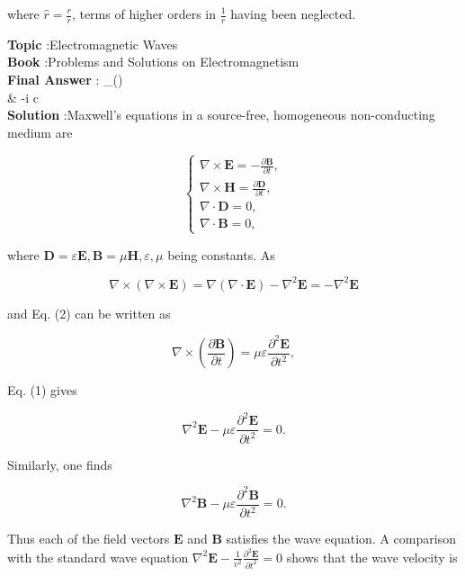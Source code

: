 \documentclass[10pt]{article}
\begin{document}
where $\hat{r}=\frac{r}{r}$, terms of higher orders in $\frac{1}{r}$ having been neglected.



\textbf{Topic} :Electromagnetic Waves\\
\textbf{Book} :Problems and Solutions on Electromagnetism\\
\textbf{Final Answer} : \nabla \times {}_{\omega}() \\
& \approx-i c   \times{}\\


\textbf{Solution} :Maxwell's equations in a source-free, homogeneous non-conducting medium are

$$
\left\{\begin{array}{l}
\nabla \times \mathbf{E}=-\frac{\partial \mathbf{B}}{\partial t}, \\
\nabla \times \mathbf{H}=\frac{\partial \mathbf{D}}{\partial t}, \\
\nabla \cdot \mathbf{D}=0, \\
\nabla \cdot \mathbf{B}=0,
\end{array}\right.
$$

where $\mathbf{D}=\varepsilon \mathbf{E}, \mathbf{B}=\mu \mathbf{H}, \varepsilon, \mu$ being constants. As

$$
\nabla \times(\nabla \times \mathbf{E})=\nabla(\nabla \cdot \mathbf{E})-\nabla^{2} \mathbf{E}=-\nabla^{2} \mathbf{E}
$$

and Eq.
(2) can be written as

$$
\nabla \times\left(\frac{\partial \mathbf{B}}{\partial t}\right)=\mu \varepsilon \frac{\partial^{2} \mathbf{E}}{\partial t^{2}},
$$

Eq.
(1) gives

$$
\nabla^{2} \mathbf{E}-\mu \varepsilon \frac{\partial^{2} \mathbf{E}}{\partial t^{2}}=0 .
$$

Similarly, one finds

$$
\nabla^{2} \mathbf{B}-\mu \varepsilon \frac{\partial^{2} \mathbf{B}}{\partial t^{2}}=0 .
$$

Thus each of the field vectors $\mathbf{E}$ and $\mathbf{B}$ satisfies the wave equation. A comparison with the standard wave equation $\nabla^{2} \mathbf{E}-\frac{1}{v^{2}} \frac{\partial^{2} \mathbf{E}}{\partial t^{2}}=0$ shows that the wave velocity is
\end{document}
